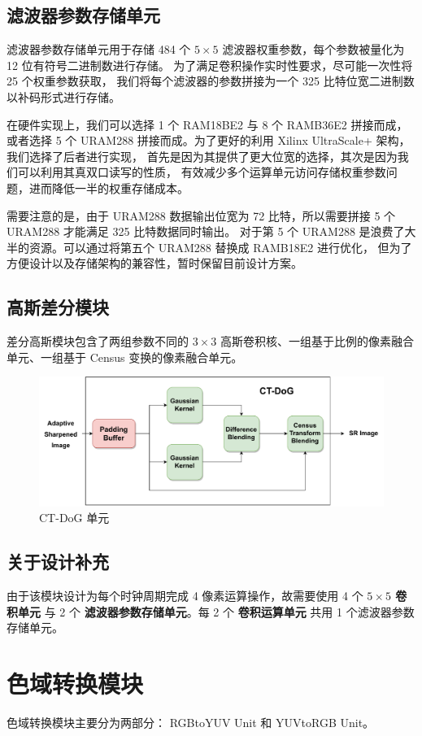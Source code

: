 \documentclass[12pt, a4paper, oneside]{ctexbook}
\begin{document}
	\section{滤波器参数存储单元}
	滤波器参数存储单元用于存储 484 个 $5\times5$ 滤波器权重参数，每个参数被量化为 12 位有符号二进制数进行存储。
	为了满足卷积操作实时性要求，尽可能一次性将 25 个权重参数获取，
	我们将每个滤波器的参数拼接为一个 325 比特位宽二进制数以补码形式进行存储。
	\par 在硬件实现上，我们可以选择 1 个 RAM18BE2 与 8 个 RAMB36E2 拼接而成，
	或者选择 5 个 URAM288 拼接而成。为了更好的利用 Xilinx UltraScale+ 架构，我们选择了后者进行实现，
	首先是因为其提供了更大位宽的选择，其次是因为我们可以利用其真双口读写的性质，
	有效减少多个运算单元访问存储权重参数问题，进而降低一半的权重存储成本。
	\par 需要注意的是，由于 URAM288 数据输出位宽为 72 比特，所以需要拼接 5 个 URAM288 才能满足 325 比特数据同时输出。
	对于第 5 个 URAM288 是浪费了大半的资源。可以通过将第五个 URAM288 替换成 RAMB18E2 进行优化，
	但为了方便设计以及存储架构的兼容性，暂时保留目前设计方案。
	\section{高斯差分模块}
	差分高斯模块包含了两组参数不同的 $3\times3$ 高斯卷积核、一组基于比例的像素融合单元、一组基于 Census 变换的像素融合单元。
	\begin{figure}
		\centering
		\includegraphics[scale=0.6]{pic/dog.drawio.pdf}
		\caption{CT-DoG 单元}
	\end{figure}	
	\section{关于设计补充} 
	由于该模块设计为每个时钟周期完成 4 像素运算操作，故需要使用 4 个 \textbf{ $5\times5$ 卷积单元} 与 2 个 \textbf{滤波器参数存储单元}。每 2 个 \textbf{卷积运算单元} 共用 1 个滤波器参数存储单元。
	
	\chapter{色域转换模块}
	色域转换模块主要分为两部分： RGBtoYUV Unit 和 YUVtoRGB Unit。
	
\end{document}

